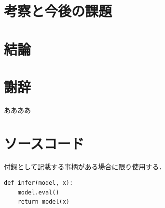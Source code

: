 \documentclass[uplatex,dvipdfmx,a4paper,11pt,openany,nomag*]{jsreport}
\begin{document}
\chapter{考察と今後の課題}
\label{chap:discussion}

\chapter{結論}
\label{chap:conclusion}

\chapter*{謝辞}

ああああ




\appendix
\chapter{ソースコード}

付録として記載する事柄がある場合に限り使用する．

\begin{verbatim}
def infer(model, x):
    model.eval()
    return model(x)
\end{verbatim}
\end{document}
